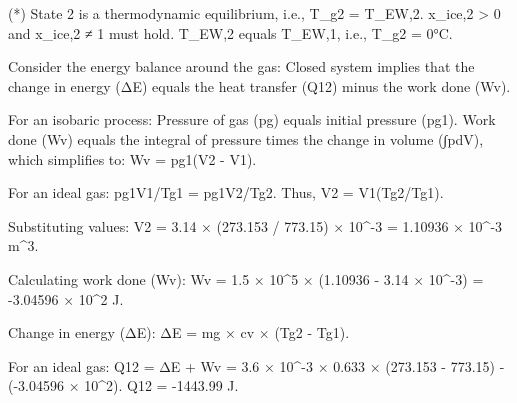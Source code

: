 (*) State 2 is a thermodynamic equilibrium, i.e., T_g2 = T_EW,2.  
x_ice,2 > 0 and x_ice,2 ≠ 1 must hold.  
T_EW,2 equals T_EW,1, i.e., T_g2 = 0°C.

Consider the energy balance around the gas:  
Closed system implies that the change in energy (ΔE) equals the heat transfer (Q12) minus the work done (Wv).  

For an isobaric process:  
Pressure of gas (pg) equals initial pressure (pg1).  
Work done (Wv) equals the integral of pressure times the change in volume (∫pdV), which simplifies to:  
Wv = pg1(V2 - V1).  

For an ideal gas:  
pg1V1/Tg1 = pg1V2/Tg2.  
Thus, V2 = V1(Tg2/Tg1).  

Substituting values:  
V2 = 3.14 × (273.153 / 773.15) × 10^-3 = 1.10936 × 10^-3 m^3.  

Calculating work done (Wv):  
Wv = 1.5 × 10^5 × (1.10936 - 3.14 × 10^-3) = -3.04596 × 10^2 J.  

Change in energy (ΔE):  
ΔE = mg × cv × (Tg2 - Tg1).  

For an ideal gas:  
Q12 = ΔE + Wv = 3.6 × 10^-3 × 0.633 × (273.153 - 773.15) - (-3.04596 × 10^2).  
Q12 = -1443.99 J.